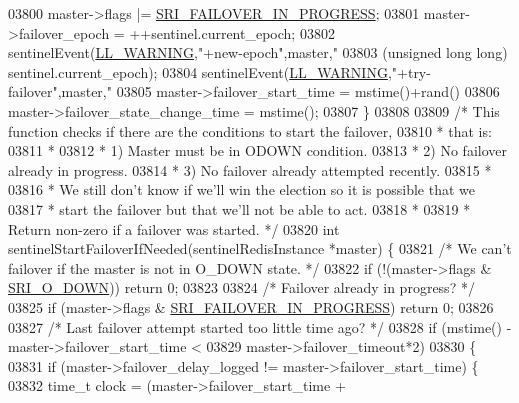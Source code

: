 \begin{DoxyCode}
{{{{{{{{{{{{{{{{{{{{{{{{{{{{{{{{{{{{{{{{{{{{{{{{{{{{{{{{{{{{{{{{{{{{{{{{{{{{{{{{{{{{03800     master->flags |= \hyperlink{sentinel_8c_a0546b63633196f09fcd90957243b0798}{SRI\_FAILOVER\_IN\_PROGRESS};
03801     master->failover\_epoch = ++sentinel.current\_epoch;
03802     sentinelEvent(\hyperlink{server_8h_a31229b9334bba7d6be2a72970967a14b}{LL\_WARNING},\textcolor{stringliteral}{"+new-epoch"},master,\textcolor{stringliteral}{"%
03803         (\textcolor{keywordtype}{unsigned} \textcolor{keywordtype}{long} \textcolor{keywordtype}{long}) sentinel.current\_epoch);
03804     sentinelEvent(\hyperlink{server_8h_a31229b9334bba7d6be2a72970967a14b}{LL\_WARNING},\textcolor{stringliteral}{"+try-failover"},master,\textcolor{stringliteral}{"%
03805     master->failover\_start\_time = mstime()+rand()%
03806     master->failover\_state\_change\_time = mstime();
03807 \}
03808 
03809 \textcolor{comment}{/* This function checks if there are the conditions to start the failover,}
03810 \textcolor{comment}{ * that is:}
03811 \textcolor{comment}{ *}
03812 \textcolor{comment}{ * 1) Master must be in ODOWN condition.}
03813 \textcolor{comment}{ * 2) No failover already in progress.}
03814 \textcolor{comment}{ * 3) No failover already attempted recently.}
03815 \textcolor{comment}{ *}
03816 \textcolor{comment}{ * We still don't know if we'll win the election so it is possible that we}
03817 \textcolor{comment}{ * start the failover but that we'll not be able to act.}
03818 \textcolor{comment}{ *}
03819 \textcolor{comment}{ * Return non-zero if a failover was started. */}
03820 \textcolor{keywordtype}{int} sentinelStartFailoverIfNeeded(sentinelRedisInstance *master) \{
03821     \textcolor{comment}{/* We can't failover if the master is not in O\_DOWN state. */}
03822     \textcolor{keywordflow}{if} (!(master->flags & \hyperlink{sentinel_8c_a3bbbca05543cd9d9f86d276e2c7c719c}{SRI\_O\_DOWN})) \textcolor{keywordflow}{return} 0;
03823 
03824     \textcolor{comment}{/* Failover already in progress? */}
03825     \textcolor{keywordflow}{if} (master->flags & \hyperlink{sentinel_8c_a0546b63633196f09fcd90957243b0798}{SRI\_FAILOVER\_IN\_PROGRESS}) \textcolor{keywordflow}{return} 0;
03826 
03827     \textcolor{comment}{/* Last failover attempt started too little time ago? */}
03828     \textcolor{keywordflow}{if} (mstime() - master->failover\_start\_time <
03829         master->failover\_timeout*2)
03830     \{
03831         \textcolor{keywordflow}{if} (master->failover\_delay\_logged != master->failover\_start\_time) \{
03832             time\_t clock = (master->failover\_start\_time +
}}}}}}}}}}}}}}}}}}}}}}}}}}}}}}}}}}}}}}}}}}}}}}}}}}}}}}}}}}}}}}}}}}}}}}}}}}}}}}}}}}}}}}
\end{DoxyCode}
